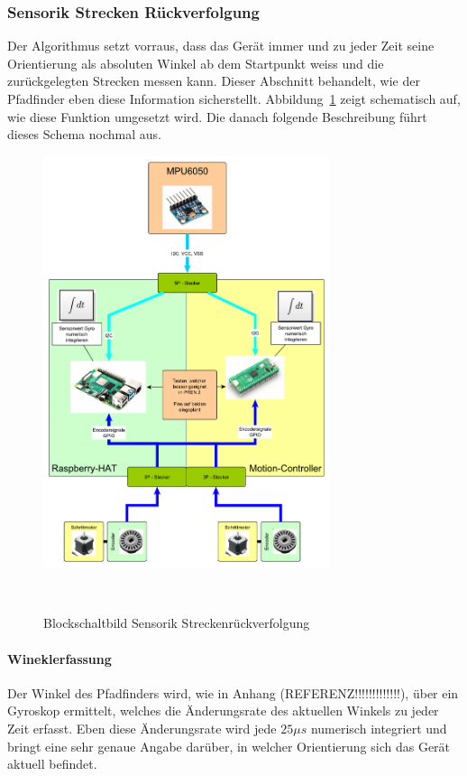 \documentclass[main.tex]{subfiles} %
\begin{document}

\subsubsection{Sensorik Strecken Rückverfolgung}

Der Algorithmus setzt vorraus, dass das Gerät immer und zu jeder Zeit seine
Orientierung als absoluten Winkel ab dem Startpunkt weiss und die
zurückgelegten Strecken messen kann. Dieser Abschnitt behandelt, wie der
Pfadfinder eben diese Information sicherstellt.
Abbildung~\ref{fig:Blockschaltbild_StreckenTracken} zeigt schematisch auf, wie
diese Funktion umgesetzt wird. Die danach folgende Beschreibung führt dieses
Schema nochmal aus.

\begin{figure}[h!]
    \centering
    \includegraphics[width=0.75\textwidth]{./fig_Strecke_Tracken/Topologie_MPU6050.pdf}
    \caption{Blockschaltbild Sensorik Streckenrückverfolgung}~\label{fig:Blockschaltbild_StreckenTracken}
\end{figure}

\paragraph{Wineklerfassung}
Der Winkel des Pfadfinders wird, wie in Anhang (REFERENZ!!!!!!!!!!!!!), über
ein Gyroskop ermittelt, welches die Änderungsrate des aktuellen Winkels zu
jeder Zeit erfasst. Eben diese Änderungsrate wird jede $25\mu s$ numerisch
integriert und bringt eine sehr genaue Angabe darüber, in welcher Orientierung
sich das Gerät aktuell befindet.
\end{document}
